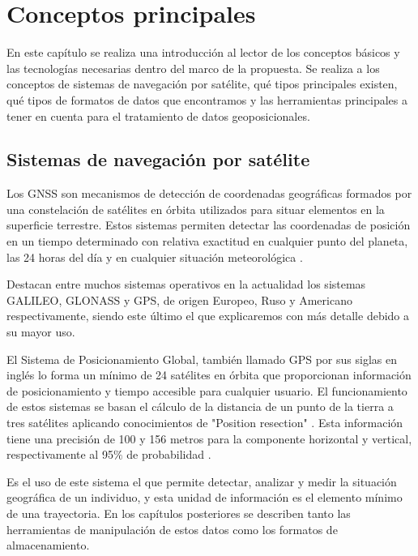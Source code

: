 

\chapter{Conceptos principales} \label{chapter:PrincipalConcepts}

En este capítulo se realiza una introducción al lector de los conceptos básicos y las 
tecnologías necesarias dentro del marco de la propuesta. Se realiza a los conceptos de sistemas de 
navegación por satélite, qué tipos principales existen, qué tipos de formatos de 
datos que encontramos y las herramientas principales a tener en cuenta para el tratamiento de datos 
geoposicionales.

\section{Sistemas de navegación por satélite} \label{}
Los \ac{GNSS} son mecanismos de detección de coordenadas geográficas formados por una constelación 
de satélites en órbita utilizados para situar elementos en la superficie terrestre. Estos sistemas permiten 
detectar las coordenadas de posición en un tiempo determinado con relativa exactitud en cualquier
punto del planeta, las 24 horas del día y en cualquier situación meteorológica \cite{Garrido-Villen01}.

Destacan entre muchos sistemas operativos en la actualidad los sistemas GALILEO, GLONASS y GPS, de 
origen Europeo, Ruso y Americano respectivamente, siendo este último el que explicaremos con más detalle 
debido a su mayor uso.

El Sistema de Posicionamiento Global, también llamado \ac{GPS} por sus siglas en inglés 
lo forma un mínimo de 24 satélites en órbita que proporcionan información de posicionamiento y tiempo 
accesible para cualquier usuario. El funcionamiento de estos sistemas se basan el cálculo de la 
distancia de un punto de la tierra a tres satélites aplicando conocimientos de "Position resection" 
\cite{Langley01}.
Esta información tiene una precisión de 100 y 156 metros para la componente horizontal y vertical, 
respectivamente al 95$\%$ de probabilidad \cite{ElRabbany01}.

Es el uso de este sistema el que permite detectar, analizar y medir la situación geográfica de un individuo, y 
esta unidad de información es el elemento mínimo de una trayectoria. En los capítulos posteriores se 
describen tanto las herramientas de manipulación de estos datos como los formatos de almacenamiento.

